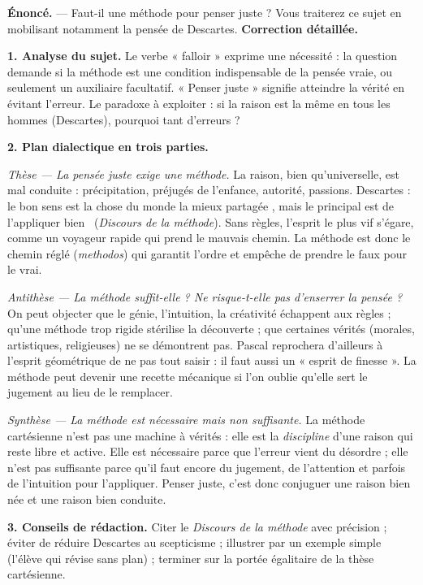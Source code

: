 \documentclass[11pt]{article}
\begin{document}
\begin{exoresolu}
\textbf{Énoncé.} — Faut-il une méthode pour penser juste ? Vous traiterez ce sujet en mobilisant notamment la pensée de Descartes.
\tcblower
\textbf{Correction détaillée.}

\textbf{1. Analyse du sujet.} Le verbe « falloir » exprime une nécessité : la question demande si la méthode est une condition indispensable de la pensée vraie, ou seulement un auxiliaire facultatif. « Penser juste » signifie atteindre la vérité en évitant l'erreur. Le paradoxe à exploiter : si la raison est la même en tous les hommes (Descartes), pourquoi tant d'erreurs ?

\textbf{2. Plan dialectique en trois parties.}

\emph{Thèse — La pensée juste exige une méthode.} La raison, bien qu'universelle, est mal conduite : précipitation, préjugés de l'enfance, autorité, passions. Descartes : le bon sens est \guillemotleft la chose du monde la mieux partagée \guillemotright, mais \guillemotleft le principal est de l'appliquer bien \guillemotright\ (\emph{Discours de la méthode}). Sans règles, l'esprit le plus vif s'égare, comme un voyageur rapide qui prend le mauvais chemin. La méthode est donc le chemin réglé (\emph{methodos}) qui garantit l'ordre et empêche de prendre le faux pour le vrai.

\emph{Antithèse — La méthode suffit-elle ? Ne risque-t-elle pas d'enserrer la pensée ?} On peut objecter que le génie, l'intuition, la créativité échappent aux règles ; qu'une méthode trop rigide stérilise la découverte ; que certaines vérités (morales, artistiques, religieuses) ne se démontrent pas. Pascal reprochera d'ailleurs à l'esprit géométrique de ne pas tout saisir : il faut aussi un « esprit de finesse ». La méthode peut devenir une recette mécanique si l'on oublie qu'elle sert le jugement au lieu de le remplacer.

\emph{Synthèse — La méthode est nécessaire mais non suffisante.} La méthode cartésienne n'est pas une machine à vérités : elle est la \emph{discipline} d'une raison qui reste libre et active. Elle est nécessaire parce que l'erreur vient du désordre ; elle n'est pas suffisante parce qu'il faut encore du jugement, de l'attention et parfois de l'intuition pour l'appliquer. Penser juste, c'est donc conjuguer une raison bien née et une raison bien conduite.

\textbf{3. Conseils de rédaction.} Citer le \emph{Discours de la méthode} avec précision ; éviter de réduire Descartes au scepticisme ; illustrer par un exemple simple (l'élève qui révise sans plan) ; terminer sur la portée égalitaire de la thèse cartésienne.
\end{exoresolu}
\end{document}
